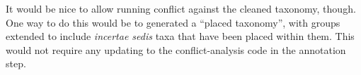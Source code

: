 \documentclass[english]{article}
\begin{document}
It would be nice to allow running conflict against the cleaned
taxonomy, though. One way to do this would be to generated a ``placed
taxonomy'', with groups extended to include \emph{incertae sedis} taxa
that have been placed within them. This would not require any updating
to the conflict-analysis code in the annotation step.

\end{document}
